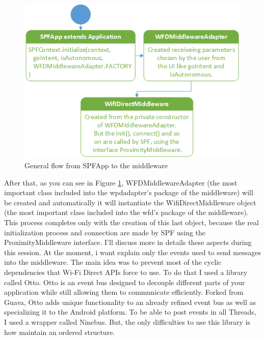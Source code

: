 \begin{figure}[thpb]
	\centering
	\includegraphics[scale=0.5]{./images/chap2/uml-parte0-1.png}
	\caption{General flow from SPFApp to the middleware}
	\label{uml-part0-1}
\end{figure}	

After that, as you can see in Figure \ref{uml-part0-1}, WFDMiddlewareAdapter (the most important class included into the \textsf{wpdadapter}'s package of the middleware) will be created and automatically it will instantiate the \textsf{WifiDirectMiddleware} object (the most important class included into the \textsf{wfd}'s package of the middleware). This process completes only with the creation of this last object, because the real initialization process and connection are made by SPF using the \textsf{ProximityMiddleware} interface. I'll discuss more in details these aspects during this session.
At the moment, i want explain only the events used to send messages into the middleware. The main idea was to prevent most of the cyclic dependencies that Wi-Fi Direct APIs force to use. To do that I used a library called Otto. 
Otto is an event bus designed to decouple different parts of your application while still allowing them to communicate efficiently. Forked from Guava, Otto adds unique functionality to an already refined event bus as well as specializing it to the Android platform.
To be able to post events in all Threads, I used a wrapper called Ninebus.
But, the only difficulties to use this library is how maintain an ordered structure. 

